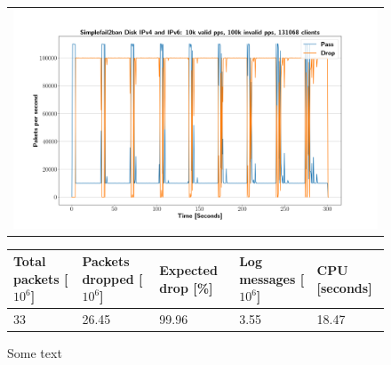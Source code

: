\begin{figure}[p]
	\label{fig:simplefail2ban:disk:ip46:100k}
	\centering
	\scriptsize
	\begin{tabular}{c}
    	\centerline{\includegraphics[width=1.2\textwidth]{images/simplefail2ban_disk_ipv46_v10k_iv100k_c131068.png}}
	\end{tabular}
	\begin{tabular}{lllll}
		\toprule
		\textbf{Total packets [$10^6$]} & \textbf{Packets dropped [$10^6$]} & \textbf{Expected drop [\%]} & \textbf{Log messages [$10^6$]} & \textbf{CPU [seconds]} \\ \midrule 
		33 & 26.45 & 99.96 & 3.55 & 18.47 \\
	\bottomrule
	\end{tabular}
	\caption[Simplefail2ban Logfile IPv4 \& IPv6 100k PPS]{Some text}
\end{figure}

